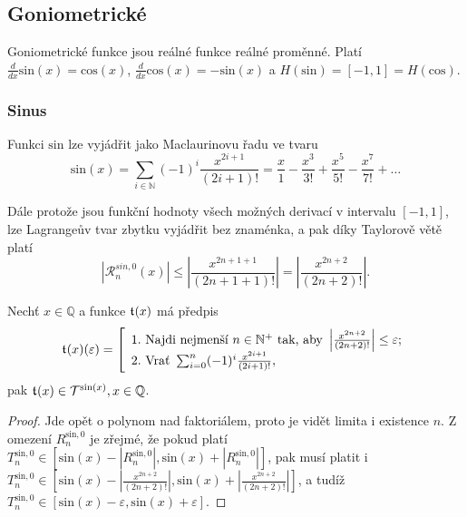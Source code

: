 \subsection{Goniometrické}
Goniometrické funkce jsou reálné funkce reálné proměnné. Platí $\frac{d}{dx}\mathrm{sin}(x) = \mathrm{cos}(x)$, $\frac{d}{dx}\mathrm{cos}(x) = -\mathrm{sin}(x)$ a $H(\mathrm{sin}) = [-1,1] = H(\mathrm{cos})$.

\subsubsection{Sinus}
\begin{fact}\label{vet:sin_jako_rada}
Funkci $\mathrm{sin}$ lze vyjádřit jako Maclaurinovu řadu ve tvaru
\begin{equation}
\mathrm{sin}(x) =\sum_{i \in \mathbb{N}} (-1)^i \frac{x^{2i+1}}{(2i+1)!} =\frac{x}{1} - \frac{x^3}{3!} + \frac{x^5}{5!} - \frac{x^7}{7!} + \ldots
\end{equation}
\end{fact}

Dále protože jsou funkční hodnoty všech možných derivací v intervalu $[-1,1]$, lze Lagrangeův tvar zbytku vyjádřit bez znaménka, a pak díky Taylorově větě platí
\begin{equation}
\left|\mathcal{R}^{sin, 0}_n(x)\right|\leq\left|\frac{x^{2n+1+1}}{(2n+1+1)!}\right|=\left|\frac{x^{2n+2}}{(2n+2)!}\right|.
\end{equation}

\begin{consequence}
Nechť $x\in\mathbb{Q}$ a funkce $\mathfrak{t}^{}(x)$ má předpis
\begin{equation}
\mathfrak{t}^{}(x)(\varepsilon)=\left[\begin{array}{l}\mathrm{1.~}\text{Najdi~nejmenší~}n\in\mathbb{N}^+\text{~tak,~aby~}\left|\frac{x^{2n+2}}{(2n+2)!}\right| \leq \varepsilon;\\
\mathrm{2.~}\text{Vrať~}\sum_{i=0}^n (-1)^i \frac{x^{2i+1}}{(2i+1)!},\end{array}\right.
\end{equation}
pak $\mathfrak{t}^{}(x)\in\mathcal{T}^{\mathrm{sin}(x)},x\in\mathbb{Q}$.
\begin{proof}
Jde opět o polynom nad faktoriálem, proto je vidět limita i existence $n$. Z omezení $R^{\mathrm{sin}, 0}_n$ je zřejmé, že pokud platí $T^{\mathrm{sin}, 0}_n\in[\mathrm{sin}(x)-|R^{\mathrm{sin}, 0}_n|,\mathrm{sin}(x)+|R^{\mathrm{sin}, 0}_n|]$, pak musí platit i $T^{\mathrm{sin}, 0}_n\in[\mathrm{sin}(x)-|\frac{x^{2n+2}}{(2n+2)!}|,\mathrm{sin}(x)+|\frac{x^{2n+2}}{(2n+2)!}|]$, a tudíž $T^{\mathrm{sin}, 0}_n\in[\mathrm{sin}(x)-\varepsilon,\mathrm{sin}(x)+\varepsilon]$.
\end{proof}
\end{consequence}

